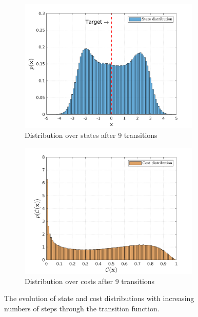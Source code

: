 \begin{figure}[htp!]
    \vspace{4ex}
  \begin{subfigure}[b]{0.48\linewidth}
    \centering
    \includegraphics[height=0.22\textheight,width=0.95\textwidth]{Chapter3/Figures/trans_traj_hist_4.png} 
    \caption{Distribution over states after 9 transitions} 
    \label{Fig:Re-hist-traj-4} 
  \end{subfigure}
  \hspace{\fill}
  \begin{subfigure}[b]{0.48\linewidth}
    \centering
    \includegraphics[height=0.22\textheight,width=0.95\textwidth]{Chapter3/Figures/trans_cost_hist_4.png} 
    \caption{Distribution over costs after 9 transitions} 
    \label{Fig:Re-hist-cost-4} 
  \end{subfigure} 
\caption[Evolution of state and cost distributions]{The evolution of state and cost distributions with increasing numbers of steps through the transition function.}
\label{Fig:Re-evolution-of-state-and-cost} 
\end{figure}

